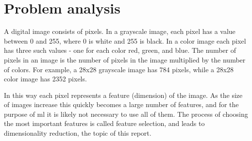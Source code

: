 \chapter{Problem analysis}\label{cha:problem-analysis}
A digital image consists of pixels. In a grayscale image, each pixel has a value between 0 and 255, where 0 is white and 255 is black. In a color image each pixel has three such values - one for each color red, green, and blue. The number of pixels in an image is the number of pixels in the image multiplied by the number of colors. For example, a 28x28 grayscale image has 784 pixels, while a 28x28 color image has 2352 pixels.

In this way each pixel represents a feature (dimension) of the image. As the size of images increase this quickly becomes a large number of features, and for the purpose of \gls{ml} it is likely not necessary to use all of them. The process of choosing the most important features is called feature selection, and leads to dimensionality reduction, the topic of this report.







